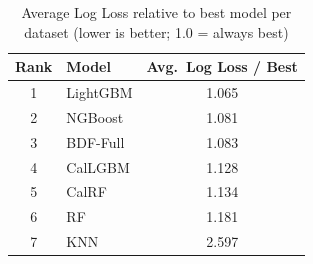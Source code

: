 \begin{table}[htbp]
\centering
\caption{Average Log Loss relative to best model per dataset (lower is better; 1.0 = always best)}
\label{tab:rel-to-best-log-loss}
\begin{tabular}{clc}
\toprule
Rank & Model & Avg.\ Log Loss / Best \\
\midrule
1 & LightGBM & 1.065 \\
2 & NGBoost & 1.081 \\
3 & BDF-Full & 1.083 \\
4 & CalLGBM & 1.128 \\
5 & CalRF & 1.134 \\
6 & RF & 1.181 \\
7 & KNN & 2.597 \\
\bottomrule
\end{tabular}
\end{table}
